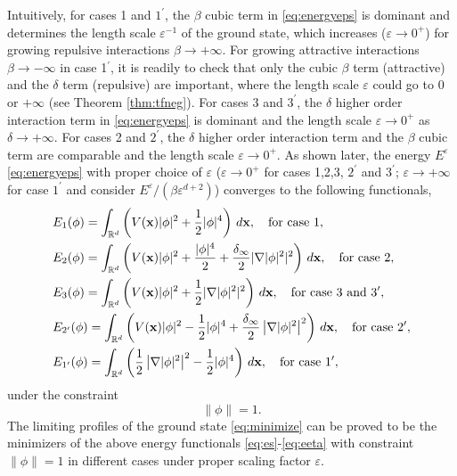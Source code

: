 \documentclass{elsarticle}
\newcommand{\vep}{\varepsilon}
\newcommand{\be}{\begin{equation}}
\newcommand{\ee}{\end{equation}}
\newcommand{\bx}{{\bf x} }
\begin{document}
Intuitively, for cases 1 and $1^\prime$, the $\beta$ cubic term in \eqref{eq:energyeps} is dominant and determines the length scale $\vep^{-1}$ of the ground state, which
increases ($\vep\to0^+$) for growing repulsive interactions $\beta\to+\infty$.   For growing attractive interactions $\beta\to-\infty$ in case 1$^\prime$, it is readily to check
that only the cubic $\beta$ term (attractive) and the $\delta$ term (repulsive) are important, where the length scale $\vep$ could go to 0 or $+\infty$ (see Theorem \ref{thm:tfneg}). For cases
3 and $3^\prime$, the $\delta$ higher order interaction term in \eqref{eq:energyeps} is dominant and the length scale $\vep\to0^+$ as $\delta\to+\infty$. For cases 2 and $2^\prime$,
the $\delta$ higher order interaction term and the $\beta$ cubic term are comparable and the length scale $\vep\to0^+$.
As shown later, the energy $E^\vep$ \eqref{eq:energyeps} with proper choice of $\vep$ ($\vep\to0^+$ for cases 1,2,3, $2^\prime$ and $3^\prime$; $\vep\to+\infty$ for case $1^\prime$ and consider $E^\vep/(\beta\vep^{d+2})$) converges to the following functionals,
\begin{align}
\label{eq:es}
&E_1(\phi)=\int_{\Bbb R^d}\left(V(\bx)|\phi|^2+\frac{1}{2}|\phi|^4\right)\,d\bx,\quad \text{for case 1},\\
\label{eq:es2}
&E_2(\phi)=\int_{\Bbb R^d}\left(V(\bx)|\phi|^2+\frac{|\phi|^4}{2}
+\frac{\delta_\infty}{2}|\nabla|\phi|^2|^2\right)\,d\bx,\quad \text{for case 2},\\
\label{eq:es1}
&E_3(\phi)=\int_{\Bbb R^d}\left(V(\bx)|\phi|^2+\frac{1}{2}|\nabla|\phi|^2|^2\right)\,d\bx, \quad\text{for case 3 and } 3^\prime,\\
\label{eq:edelta}
&E_{2^\prime}(\phi)=\int_{\Bbb R^d}\left(V(\mathbf{x})|\phi|^2-\frac{1}{2}|\phi|^4+\frac{\delta_\infty}{2}\left|\nabla|\phi|^2\right|^2\right)\,d\bx,\quad
\text{for case } 2^\prime,\\
\label{eq:eeta}
&E_{1^\prime}(\phi)=\int_{\Bbb R^d}\left(\frac{1}{2}\left|\nabla|\phi|^2\right|^2-\frac{1}{2}|\phi|^4\right)\,d\bx, \quad\text{for case } 1^\prime,
\end{align}
under the constraint
\be\label{eq:constraint}
\|\phi\|=1.
\ee The limiting profiles of the ground state \eqref{eq:minimize} can be proved to be the minimizers of the above energy functionals
\eqref{eq:es}-\eqref{eq:eeta} with constraint $\|\phi\|=1$ in different cases under proper scaling factor $\vep$.
\end{document}

